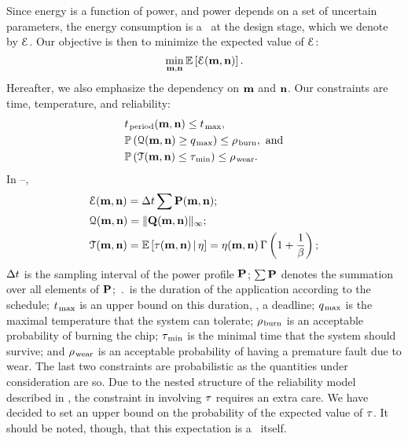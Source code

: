 Since energy is a function of power, and power depends on a set of uncertain parameters, the energy consumption is a \rv\ at the design stage, which we denote by $\qoiE$.
Our objective is then to minimize the expected value of $\qoiE$:
\begin{equation} \elab{objective}
  \min_{\mapping, \priority} \expectation{\qoiE(\mapping, \priority)}.
\end{equation}
Hereafter, we also emphasize the dependency on $\mapping$ and $\priority$.
Our constraints are time, temperature, and reliability:
\begin{align}
  & \period(\mapping, \priority) \leq \t_\maximal, \elab{timing-constraint} \\
  & \probabilityMeasure\left( \qoiQ(\mapping, \priority) \geq \q_\maximal \right) \leq \pr_\burn, \text{ and} \elab{thermal-constraint} \\
  & \probabilityMeasure\left( \qoiT(\mapping, \priority) \leq \T_\minimal \right) \leq \pr_\wear. \elab{reliability-constraint}
\end{align}
In --,
\begin{align*}
  & \qoiE(\mapping, \priority) = \dt \sum \mP(\mapping, \priority); \\
  & \qoiQ(\mapping, \priority) = \norm[\infty]{\mQ(\mapping, \priority)}; \\
  & \qoiT(\mapping, \priority) = \expectation{\T(\mapping, \priority) \, | \, \eta} = \eta(\mapping, \priority) \, \Gamma\left(1 + \frac{1}{\beta}\right);
\end{align*}
$\dt$ is the sampling interval of the power profile $\mP$; $\sum \mP$ denotes the summation over all elements of $\mP$; $\period$ is the duration of the application according to the schedule; $\t_\maximal$ is an upper bound on this duration, \ie, a deadline; $\q_\maximal$ is the maximal temperature that the system can tolerate; $\pr_\burn$ is an acceptable probability of burning the chip; $\T_\minimal$ is the minimal time that the system should survive; and $\pr_\wear$ is an acceptable probability of having a premature fault due to wear.
The last two constraints are probabilistic as the quantities under consideration are so.
Due to the nested structure of the reliability model described in , the constraint in  involving $\T$ requires an extra care.
We have decided to set an upper bound on the probability of the expected value of $\T$.
It should be noted, though, that this expectation is a \rv\ itself.

